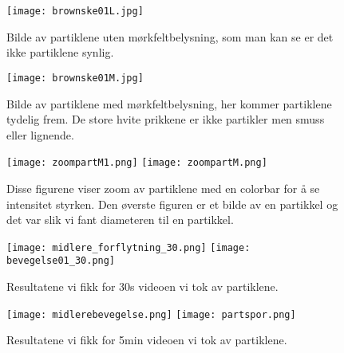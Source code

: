 \documentclass[norsk,a4paper,12pt]{article}
\begin{document}
\begin{figure}
	\begin{center}
  	\texttt{[image: brownske01L.jpg]}\\
	\caption[Bilde av partiklene uten mørkfeltbelysning]{Bilde av partiklene uten mørkfeltbelysning, som man kan se er det ikke partiklene synlig.}
	\label{partlys}
	\end{center}
\end{figure}
\begin{figure}
	\begin{center}
  	\texttt{[image: brownske01M.jpg]}\\
	\caption[Bilde av partiklene med mørkfeltbelysning]{Bilde av partiklene med mørkfeltbelysning, her kommer partiklene tydelig frem. De store hvite prikkene er ikke partikler men smuss eller lignende.}
	\label{partmork}
	\end{center}
\end{figure}

\begin{figure}
	\begin{center}
  	\texttt{[image: zoompartM1.png]}
	\texttt{[image: zoompartM.png]}\\
	\caption[Zoom av partiklene]{Disse figurene viser zoom av partiklene med en colorbar for å se intensitet styrken. Den øverste figuren er et bilde av en partikkel og det var slik vi fant diameteren til en partikkel.}
	\label{zoom}
	\end{center}
\end{figure}
\begin{figure}
	\begin{center}
  	\texttt{[image: midlere\_forflytning\_30.png]}
	\texttt{[image: bevegelse01\_30.png]}\\
	\caption[Resultater for 30s video]{Resultatene vi fikk for 30s videoen vi tok av partiklene.}
	\label{resultater30s}
	\end{center}
\end{figure}
\begin{figure}
	\begin{center}
  	\texttt{[image: midlerebevegelse.png]}
	\texttt{[image: partspor.png]}\\
	\caption[Resultater for 5min video]{Resultatene vi fikk for 5min videoen vi tok av partiklene.}
	\label{resultater5min}
	\end{center}
\end{figure}
\end{document}
